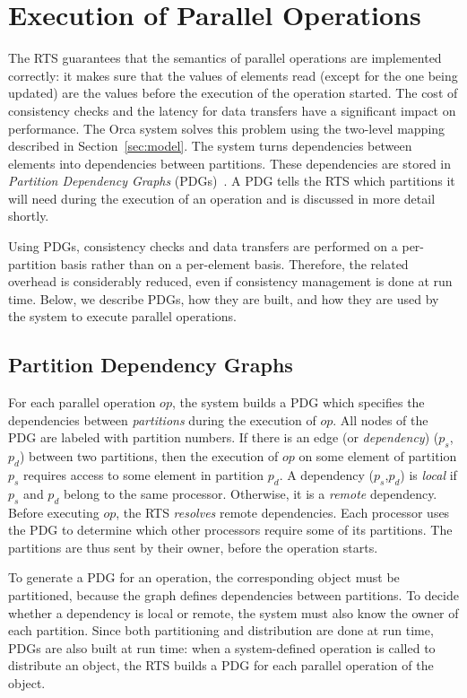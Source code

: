 \documentclass{acmtrans2e}
\begin{document}
\section{Execution of Parallel Operations}
\label{sec:dependencies}

The RTS guarantees that the semantics of parallel
operations are implemented correctly:
it makes sure that the values of elements read
(except for the one being updated) are the values before the execution
of the operation started. The cost of consistency checks and the
latency for data transfers have a significant impact on
performance. The Orca system solves this problem using the two-level
mapping described in Section~\ref{sec:model}. The system turns
dependencies between elements into dependencies between
partitions. These dependencies are stored in {\em Partition Dependency
Graphs} (PDGs)~\cite{hicss96,jpaa97}. A PDG tells the RTS which
partitions it will need during the execution of an operation and is
discussed in more detail shortly.

Using PDGs, consistency checks and data transfers are performed on a
per-partition basis rather than on a per-element basis. Therefore, the
related overhead is considerably reduced, even if consistency
management is done at run time. Below, we describe PDGs, how they are
built, and how they are used by the system to execute parallel
operations.

\subsection{Partition Dependency Graphs}
\label{sec:pdg}

For each parallel operation $op$, the system builds a PDG which
specifies the dependencies between \emph{partitions} during the
execution of $op$. All nodes of the PDG are labeled with partition
numbers. If there is an edge (or \emph{dependency}) ($p_s$,$p_d$)
between two partitions, then the execution of $op$ on some element of
partition $p_s$ requires access to some element in partition $p_d$. A
dependency ($p_s$,$p_d$) is \emph{local} if $p_s$ and $p_d$ belong to
the same processor. Otherwise, it is a \emph{remote} dependency.
Before executing $op$, the RTS \emph{resolves} remote dependencies.
Each processor uses the PDG to determine which other processors
require some of its partitions. The partitions are thus sent by
their owner, before the operation starts.

To generate a PDG for an operation, the corresponding object must be
partitioned, because the graph defines dependencies between
partitions. To decide whether a dependency is local or remote, the
system must also know the owner of each partition. Since both
partitioning and distribution are done at run time, PDGs are also built
at run time: when a system-defined operation is called to distribute an
object, the RTS builds a PDG for each parallel operation of the
object.
\end{document}
